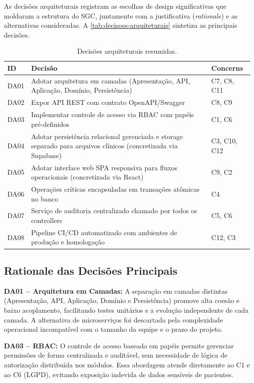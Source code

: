 As decisões arquiteturais registram as escolhas de design significativas que moldaram a estrutura do SGC, juntamente com a justificativa (\textit{rationale}) e as alternativas consideradas. A \autoref{tab:decisoes-arquiteturais} sintetiza as principais decisões.

\begin{table}[htbp]
\caption{Decisões arquiteturais resumidas.}
\label{tab:decisoes-arquiteturais}
\centering
\small
\begin{tabularx}{\textwidth}{|l|X|l|}
\hline
\textbf{ID} & \textbf{Decisão} & \textbf{Concerns} \\
\hline
DA01 & Adotar arquitetura em camadas (Apresentação, API, Aplicação, Domínio, Persistência) & C7, C8, C11 \\
DA02 & Expor API REST com contrato OpenAPI/Swagger & C8, C9 \\
DA03 & Implementar controle de acesso via RBAC com papéis pré-definidos & C1, C6 \\
DA04 & Adotar persistência relacional gerenciada e storage separado para arquivos clínicos (concretizada via Supabase) & C3, C10, C12 \\
DA05 & Adotar interface web SPA responsiva para fluxos operacionais (concretizada via React) & C9, C2 \\
DA06 & Operações críticas encapsuladas em transações atômicas no banco & C4 \\
DA07 & Serviço de auditoria centralizado chamado por todos os controllers & C5, C6 \\
DA08 & Pipeline CI/CD automatizado com ambientes de produção e homologação & C12, C3 \\
\hline
\end{tabularx}
\end{table}

\subsection{Rationale das Decisões Principais}
\label{sec:rationale}

\textbf{DA01 -- Arquitetura em Camadas:} A separação em camadas distintas (Apresentação, API, Aplicação, Domínio e Persistência) promove alta coesão e baixo acoplamento, facilitando testes unitários e a evolução independente de cada camada. A alternativa de microserviços foi descartada pela complexidade operacional incompatível com o tamanho da equipe e o prazo do projeto.

\textbf{DA03 -- RBAC:} O controle de acesso baseado em papéis permite gerenciar permissões de forma centralizada e auditável, sem necessidade de lógica de autorização distribuída nos módulos. Essa abordagem atende diretamente ao C1 e ao C6 (LGPD), evitando exposição indevida de dados sensíveis de pacientes.

